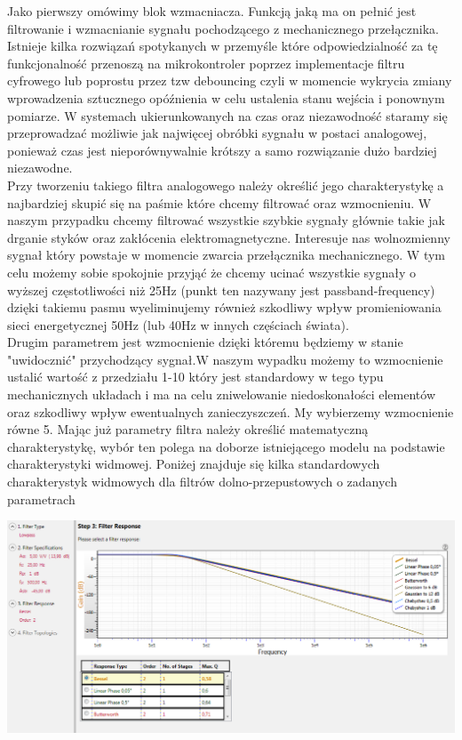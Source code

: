 Jako pierwszy omówimy blok wzmacniacza. Funkcją jaką ma on pełnić jest filtrowanie i wzmacnianie sygnału pochodzącego z mechanicznego przełącznika. Istnieje kilka rozwiązań spotykanych w przemyśle które odpowiedzialność za tę funkcjonalność przenoszą na mikrokontroler poprzez implementacje filtru cyfrowego lub poprostu przez tzw debouncing czyli w momencie wykrycia zmiany wprowadzenia sztucznego opóźnienia w celu ustalenia stanu wejścia i ponownym pomiarze. W systemach ukierunkowanych na czas oraz niezawodność staramy się przeprowadzać możliwie jak najwięcej obróbki sygnału w postaci analogowej, ponieważ czas jest nieporównywalnie krótszy a samo rozwiązanie dużo bardziej niezawodne. \\
Przy tworzeniu takiego filtra analogowego należy określić jego charakterystykę a najbardziej skupić się na paśmie które chcemy filtrować oraz wzmocnieniu. W naszym przypadku chcemy filtrować wszystkie szybkie sygnały głównie takie jak drganie styków oraz zakłócenia elektromagnetyczne. Interesuje nas wolnozmienny sygnał który powstaje w momencie zwarcia przełącznika mechanicznego.
W tym celu możemy sobie spokojnie przyjąć że chcemy ucinać wszystkie sygnały o wyższej częstotliwości niż 25Hz (punkt ten nazywany jest passband-frequency) dzięki takiemu pasmu wyeliminujemy również szkodliwy wpływ promieniowania sieci energetycznej 50Hz (lub 40Hz w innych częściach świata). \\ 
Drugim parametrem jest wzmocnienie dzięki któremu będziemy w stanie "uwidocznić" przychodzący sygnał.W naszym wypadku możemy to wzmocnienie ustalić wartość z przedziału 1-10 który jest standardowy w tego typu mechanicznych układach i ma na celu zniwelowanie niedoskonałości elementów oraz szkodliwy wpływ ewentualnych zanieczyszczeń. My wybierzemy wzmocnienie równe 5.
Mając już parametry filtra należy określić matematyczną charakterystykę, wybór ten polega na doborze istniejącego modelu na podstawie charakterystyki widmowej. Poniżej znajduje się kilka standardowych charakterystyk widmowych dla filtrów dolno-przepustowych o zadanych parametrach

\centerline{\includegraphics[scale=0.40]{./img/target_system/filtr/wybor_chrt_filtra.png}} 

